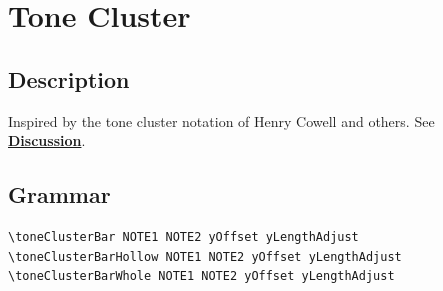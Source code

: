 \vfill \break


\section {Tone Cluster}
\hfill
\subsection{Description}
Inspired by the tone cluster notation of Henry Cowell and others. See \hyperref[sec:tone_cluster_discussion]{\textbf{Discussion}}.
\subsection{Grammar}
\begin{verbatim}
\toneClusterBar NOTE1 NOTE2 yOffset yLengthAdjust
\toneClusterBarHollow NOTE1 NOTE2 yOffset yLengthAdjust
\toneClusterBarWhole NOTE1 NOTE2 yOffset yLengthAdjust
\end{verbatim}
